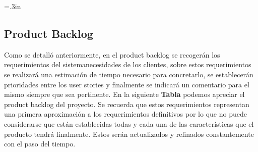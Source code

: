 \documentclass[a4paper,12pt]{article}
\begin{document}
	\headheight=.3in
	\renewcommand{\headrulewidth}{0.5pt} %
	\lhead[]{}
	\chead[]{}
	\rhead[]{}
	\cfoot[]{}
	\rfoot[\thepage]{\thepage}%
	\renewcommand{\footrulewidth}{0.5pt}



\tableofcontents

\newpage


\subsection{Product Backlog}

Como se detalló anteriormente, en el product backlog  se recogerán los requerimientos del sistema\/necesidades de los clientes, sobre estos requerimientos se realizará una estimación de tiempo necesario para concretarlo, se establecerán prioridades entre los user stories y finalmente se indicará un comentario para el mismo siempre que sea pertinente. 
En la siguiente \textbf{Tabla} podemos apreciar el product backlog del proyecto.
Se recuerda que estos requerimientos representan una primera aproximación a los requerimientos definitivos por lo que no puede considerarse que están establecidas todas y cada una de las características que el producto tendrá finalmente. Estos serán actualizados y refinados constantemente con el paso del tiempo.
\end{document}
